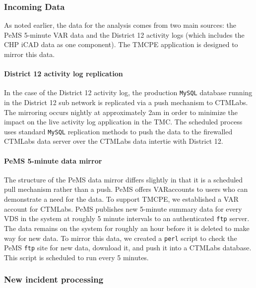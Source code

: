 \documentclass[12pt]{report}
\begin{document}
\subsubsection{Incoming Data}
\label{sec:incoming-data}

As noted earlier, the data for the analysis comes from two main sources: the
\ac{PeMS} 5-minute \ac{VAR} data and the District 12 activity logs (which includes
the \ac{CHP} \ac{iCAD} data as one component).  The \ac{TMCPE} application is
designed to mirror this data.  

\paragraph{District 12 activity log replication}

In the case of the District 12 activity log, the production \texttt{MySQL} database
running in the District 12 sub network is replicated via a push mechanism to
\ac{CTMLabs}.  The mirroring occurs nightly at approximately 2am in order to
minimize the impact on the live activity log application in the \ac{TMC}.  The
scheduled process uses standard \texttt{MySQL} replication methods to push the
data to the firewalled \ac{CTMLabs} data server over the \ac{CTMLabs} data
intertie with District 12.

\paragraph{PeMS 5-minute data mirror}

The structure of the \ac{PeMS} data mirror differs slightly in that it is a
scheduled pull mechanism rather than a push.  \ac{PeMS} offers \acf{VAR}accounts
to users who can demonstrate a need for the data.  To support \ac{TMCPE}, we
established a \ac{VAR} account for \ac{CTMLabs}.  \ac{PeMS} publishes new
5-minute summary data for every \ac{VDS} in the system at roughly 5 minute
intervals to an authenticated \texttt{ftp} server.  The data remains on the
system for roughly an hour before it is deleted to make way for new data.  To
mirror this data, we created a \texttt{perl} script to check the \ac{PeMS}
\texttt{ftp} site for new data, download it, and push it into a \ac{CTMLabs}
database.  This script is scheduled to run every 5 minutes.


\subsubsection{New incident processing}
\label{sec:incident-processing}
\end{document}
